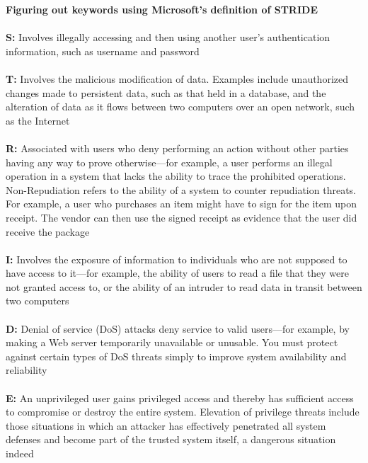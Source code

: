 \clearpage
\textbf{Figuring out keywords using Microsoft's definition of STRIDE}\\\\

\textbf{S:} Involves illegally accessing and then using another user's authentication information, such as username and password \\\\
\textbf{T:} Involves the malicious modification of data. Examples include unauthorized changes made to persistent data, such as that held in a database, and the alteration of data as it flows between two computers over an open network, such as the Internet \\\\
\textbf{R:} Associated with users who deny performing an action without other parties having any way to prove otherwise—for example, a user performs an illegal operation in a system that lacks the ability to trace the prohibited operations. Non-Repudiation refers to the ability of a system to counter repudiation threats. For example, a user who purchases an item might have to sign for the item upon receipt. The vendor can then use the signed receipt as evidence that the user did receive the package \\\\
\textbf{I:} Involves the exposure of information to individuals who are not supposed to have access to it—for example, the ability of users to read a file that they were not granted access to, or the ability of an intruder to read data in transit between two computers \\\\
\textbf{D:} Denial of service (DoS) attacks deny service to valid users—for example, by making a Web server temporarily unavailable or unusable. You must protect against certain types of DoS threats simply to improve system availability and reliability \\\\
\textbf{E:} An unprivileged user gains privileged access and thereby has sufficient access to compromise or destroy the entire system. Elevation of privilege threats include those situations in which an attacker has effectively penetrated all system defenses and become part of the trusted system itself, a dangerous situation indeed \\\\


